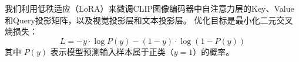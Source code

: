 我们利用低秩适应（LoRA）来微调CLIP图像编码器中自注意力层的Key、Value和Query投影矩阵，以及视觉投影层和文本投影层。
优化目标是最小化二元交叉熵损失：
\begin{equation}
L = -y \cdot \log P(y) - (1 - y) \cdot \log(1 - P(y))
\label{eq:loss}
\end{equation}
其中 $ P(y) $ 表示模型预测输入样本属于正类（$ y = 1 $）的概率。










% 
% 

